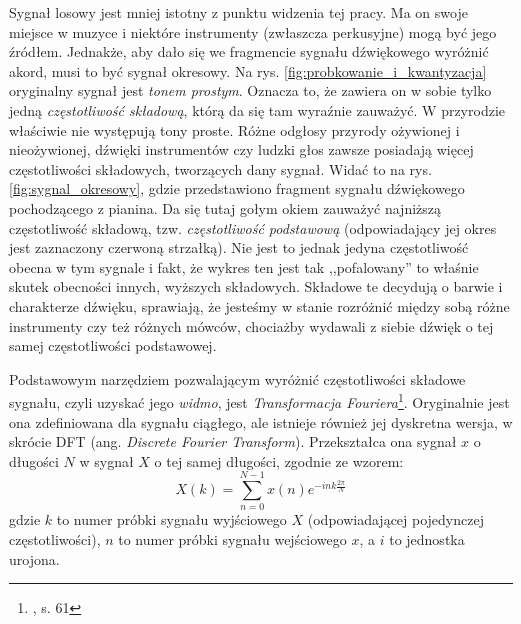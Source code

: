 Sygnał losowy jest mniej istotny z punktu widzenia tej pracy. Ma on swoje miejsce w muzyce i niektóre instrumenty (zwłaszcza perkusyjne) mogą być jego źródłem. Jednakże, aby dało się we fragmencie sygnału dźwiękowego wyróżnić akord, musi to być sygnał okresowy. Na rys. \ref{fig:probkowanie_i_kwantyzacja} oryginalny sygnał jest \emph{tonem prostym}. Oznacza to, że zawiera on w sobie tylko jedną \emph{częstotliwość składową}, którą da się tam wyraźnie zauważyć. W przyrodzie właściwie nie występują tony proste. Różne odgłosy przyrody ożywionej i nieożywionej, dźwięki instrumentów czy ludzki głos zawsze posiadają więcej częstotliwości składowych, tworzących dany sygnał. Widać to na rys. \ref{fig:sygnal_okresowy}, gdzie przedstawiono fragment sygnału dźwiękowego pochodzącego z pianina. Da się tutaj gołym okiem zauważyć najniższą częstotliwość składową, tzw. \emph{częstotliwość podstawową} (odpowiadający jej okres jest zaznaczony czerwoną strzałką). Nie jest to jednak jedyna częstotliwość obecna w tym sygnale i fakt, że wykres ten jest tak ,,pofalowany'' to właśnie skutek obecności innych, wyższych składowych. Składowe te decydują o barwie i charakterze dźwięku, sprawiają, że jesteśmy w stanie rozróżnić między sobą różne instrumenty czy też różnych mówców, chociażby wydawali z siebie dźwięk o tej samej częstotliwości podstawowej. 

Podstawowym narzędziem pozwalającym wyróżnić częstotliwości składowe sygnału, czyli uzyskać jego \emph{widmo}, jest \emph{Transformacja Fouriera}\footnote{\cite{lyons_wprowadzenie_2000}, s. 61}. Oryginalnie jest ona zdefiniowana dla sygnału ciągłego, ale istnieje również jej dyskretna wersja, w skrócie DFT (ang. \emph{Discrete Fourier Transform}). Przekształca ona sygnał $x$ o długości $N$ w sygnał $X$ o tej samej długości, zgodnie ze wzorem:
\begin{equation} \label{eq:dft}
    X(k) = \sum_{n=0}^{N-1} x(n) e^{-ink \frac{2 \pi}{N}}
\end{equation}
gdzie $k$ to numer próbki sygnału wyjściowego $X$ (odpowiadającej pojedynczej częstotliwości), $n$ to numer próbki sygnału wejściowego $x$, a $i$ to jednostka urojona.

